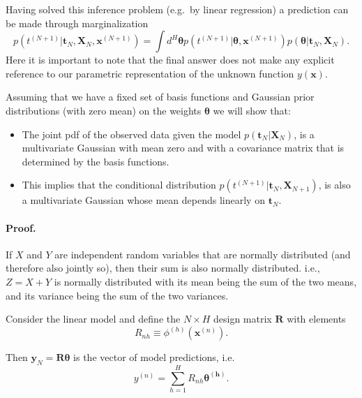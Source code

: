 \documentclass[%
oneside,                 %
final,                   %
10pt]{article}
\newenvironment{notice_mdfboxadmon}[1][]{
\begin{notice_mdfboxmdframed}[frametitle=#1]
}
{
\end{notice_mdfboxmdframed}
}
\begin{document}
Having solved this inference problem (e.g.~by linear regression) a prediction can be made through marginalization
\[
p\left( t^{(N+1)} | \boldsymbol{t}_N, \boldsymbol{X}_{N}, \boldsymbol{x}^{(N+1)} \right) 
= \int d^H \boldsymbol{\theta} 
p\left( t^{(N+1)} | \boldsymbol{\theta}, \boldsymbol{x}^{(N+1)} \right)
p \left( \boldsymbol{\theta} | \boldsymbol{t}_N, \boldsymbol{X}_N \right).
\]
Here it is important to note that the final answer does not make any explicit reference to our parametric representation of the unknown function $y(\boldsymbol{x})$.

Assuming that we have a fixed set of basis functions and Gaussian prior distributions (with zero mean) on the weights $\boldsymbol{\theta}$ we will show that:

\begin{itemize}
\item The joint pdf of the observed data given the model $p( \boldsymbol{t}_N |  \boldsymbol{X}_N)$, is a multivariate Gaussian with mean zero and with a covariance matrix that is determined by the basis functions.

\item This implies that the conditional distribution $p( t^{(N+1)} | \boldsymbol{t}_N, \boldsymbol{X}_{N+1})$, is also a multivariate Gaussian whose mean depends linearly on $\boldsymbol{t}_N$.
\end{itemize}

\noindent
\paragraph{Proof.}

\begin{notice_mdfboxadmon}
If $X$ and $Y$ are independent random variables that are normally distributed (and therefore also jointly so), then their sum is also normally distributed. i.e., $Z=X+Y$ is normally distributed with its mean being the sum of the two means, and its variance being the sum of the two variances.
\end{notice_mdfboxadmon} %



Consider the linear model and define the $N \times H$ design matrix $\boldsymbol{R}$ with elements
\[
R_{nh} \equiv \phi^{(h)} \left( \boldsymbol{x}^{(n)} \right).
\]

Then $\boldsymbol{y}_N = \boldsymbol{R} \boldsymbol{\theta}$ is the vector of model predictions, i.e.
\[
y^{(n)} = \sum_{h=1}^H R_{nh} \boldsymbol{\theta^{(h)}}.
\]
\end{document}
